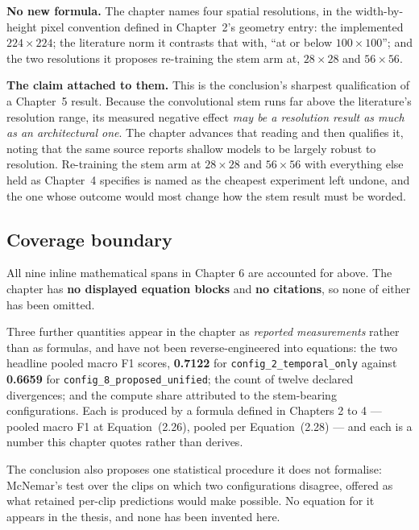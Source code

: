 \documentclass[11pt,a4paper]{article}
\numberwithin{equation}{section}
\begin{document}
\textbf{No new formula.} The chapter names four spatial resolutions, in the
width-by-height pixel convention defined in Chapter~2's geometry entry:
the implemented $224 \times 224$; the literature norm it contrasts that with,
``at or below $100 \times 100$''; and the two resolutions it proposes
re-training the stem arm at, $28 \times 28$ and $56 \times 56$.

\textbf{The claim attached to them.} This is the conclusion's sharpest
qualification of a Chapter~5 result. Because the convolutional stem runs far
above the literature's resolution range, its measured negative effect
\emph{may be a resolution result as much as an architectural one}. The chapter
advances that reading and then qualifies it, noting that the same source
reports shallow models to be largely robust to resolution. Re-training the
stem arm at $28 \times 28$ and $56 \times 56$ with everything else held as
Chapter~4 specifies is named as the cheapest experiment left undone, and the
one whose outcome would most change how the stem result must be worded.

\subsection{Coverage boundary}

All nine inline mathematical spans in Chapter 6 are accounted for above. The
chapter has \textbf{no displayed equation blocks} and \textbf{no citations},
so none of either has been omitted.

Three further quantities appear in the chapter as \emph{reported measurements}
rather than as formulas, and have not been reverse-engineered into equations:
the two headline pooled macro F1 scores, \textbf{0.7122} for
\texttt{config\_2\_temporal\_only} against \textbf{0.6659} for
\texttt{config\_8\_proposed\_unified}; the count of twelve declared
divergences; and the compute share attributed to the stem-bearing
configurations. Each is produced by a formula defined in Chapters 2 to 4 ---
pooled macro F1 at Equation~(2.26), pooled per Equation~(2.28) --- and each is
a number this chapter quotes rather than derives.

The conclusion also proposes one statistical procedure it does not formalise:
McNemar's test over the clips on which two configurations disagree, offered as
what retained per-clip predictions would make possible. No equation for it
appears in the thesis, and none has been invented here.
\end{document}
